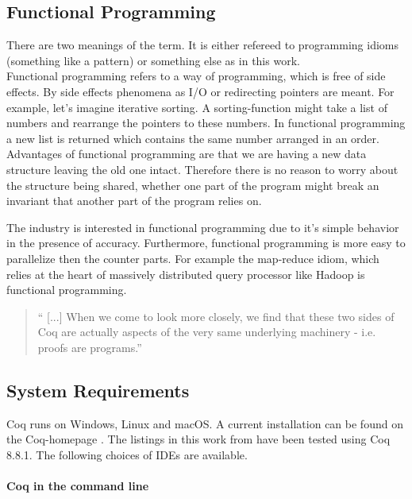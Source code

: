 \subsection{Functional Programming}

There are two meanings of the term. 
It is either refereed to programming idioms (something like a pattern) or something else as in this work.\\

Functional programming refers to a way of programming, which is free of side effects.
By side effects phenomena as I/O or redirecting pointers are meant. 
For example, let's imagine iterative sorting. 
A sorting-function might take a list of numbers and rearrange the pointers to these numbers.
In functional programming a new list is returned which contains the same number arranged in an order.\\ 
Advantages of functional programming are that we are having a new data structure leaving the old one intact. 
Therefore there is no reason to worry about the structure being shared, whether one part of the program might break an invariant that another part of the program relies on.\par
The industry is interested in functional programming due to it's simple behavior in the presence of accuracy.
Furthermore, functional programming is more easy to parallelize then the counter parts.
For example the map-reduce idiom, which relies at the heart of massively distributed query processor like \gls{Hadoop} is functional programming. 

\begin{quote}
`` [...] When we come to look more closely, we find that these two sides of Coq are actually aspects of the very same underlying machinery - i.e. proofs are programs.'' 
\end{quote}




\subsection{System Requirements}

Coq runs on Windows, Linux and macOS.
A current installation can be found on the Coq-homepage \cite{}. 
The listings in this work from \cite{PACGGHSY} have been tested using Coq 8.8.1.
The following choices of IDEs are available. 


\paragraph{Coq in the command line}

